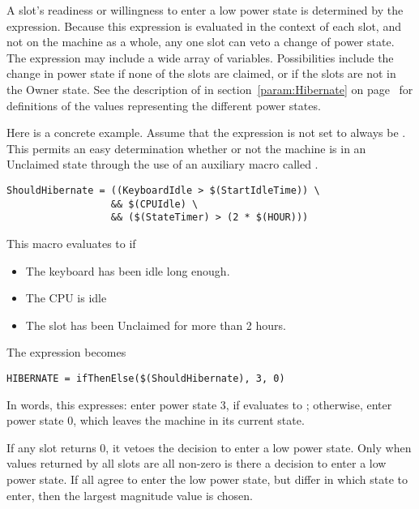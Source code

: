 A slot's readiness or willingness to enter a low power state is 
determined by the  expression. 
Because this expression is evaluated in the context of each slot,
and not on the machine as a whole, 
any one slot can veto a change of power state.  
The  expression may include a wide array of variables.
Possibilities include the change in power state if 
none of the slots are claimed, or if the slots are not in the
Owner state.
See the description of  in
section~\ref{param:Hibernate} on page~\pageref{param:Hibernate}
for definitions of the values representing the different
power states.

Here is a concrete example.
Assume that the  expression is not set to
always be .
This permits an easy determination whether or not
the machine is in an Unclaimed state through the use of
an auxiliary macro called .

\begin{verbatim}
ShouldHibernate = ((KeyboardIdle > $(StartIdleTime)) \
                  && $(CPUIdle) \
                  && ($(StateTimer) > (2 * $(HOUR)))
\end{verbatim}

This macro evaluates to  if
\begin{itemize}
\item The keyboard has been idle long enough.
\item The CPU is idle
\item The slot has been Unclaimed for more than 2 hours.
\end{itemize}

The  expression becomes

\begin{verbatim}
HIBERNATE = ifThenElse($(ShouldHibernate), 3, 0)
\end{verbatim}

In words, this expresses:
enter power state $3$,
if  evaluates to ; 
otherwise, enter power state $0$,
which leaves the machine in its current state. 

If any slot returns $0$, 
it vetoes the decision to enter a low power state.
Only when values returned by all slots are all non-zero 
is there a decision to enter a low power state.
If all agree to enter the low power state, but differ in which state to enter,
then the largest magnitude value is chosen. 

